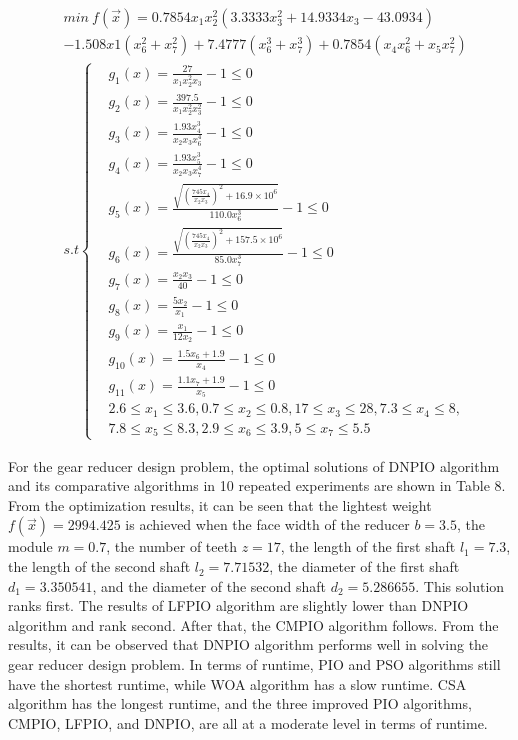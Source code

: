 \documentclass[preprint,review,compress,12pt]{elsarticle}
\begin{document}

\begin{equation}  \begin{split}  &min\ f(\vec{x})=0.7854x_1x^2_2(3.3333x^2_3+ 14.9334x_3−43.0934) \\
&−1.508x1(x^2_6+x^2_7) + 7.4777(x^3_6+x^3_7) + 0.7854(x_4x^2_6+x_5x^2_7)  \\
&s.t\left\{\begin{matrix}
 &g_1(x)=\frac{27}{x_1x^2_2x_3}-1 \le 0\\
 &g_2(x)=\frac{397.5}{x_1x^2_2x^2_3}-1 \le 0\\
 &g_3(x)=\frac{1.93x^3_4}{x_2x_3x^4_6}-1 \le 0\\
&g_4(x)=\frac{1.93x^3_5}{x_2x_3x^4_7}-1 \le 0\\
&g_5(x)=\frac{\sqrt{(\frac{745x_4}{x_2x_3})^2 +16.9\times 10^6 } }{110.0x^3_6}-1\le 0 \\
&g_6(x)=\frac{\sqrt{(\frac{745x_4}{x_2x_3})^2 +157.5\times 10^6 } }{85.0x^3_7}-1\le 0 \\
&g_7(x)=\frac{x_2x_3}{40}-1\le 0  \\
&g_8(x)=\frac{5x_2}{x_1}-1\le 0  \\
&g_9(x)=\frac{x_1}{12x_2}-1\le 0  \\
&g_10(x)=\frac{1.5x_6+1.9}{x_4}-1\le 0  \\
&g_11(x)=\frac{1.1x_7+1.9}{x_5}-1\le 0  \\
&2.6\le x_1 \le3.6, 0.7 \le x_2 \le 0.8, 17\le x_3 \le28, 7.3\le x_4 \le 8,\\ &7.8 \le x_5 \le8.3, 2.9\le x_6 \le 3.9, 5\le x_7 \le 5.5
\end{matrix}\right.  
\end{split}  \end{equation}

For the gear reducer design problem, the optimal solutions of DNPIO algorithm and its comparative algorithms in 10 repeated experiments are shown in Table 8. From the optimization results, it can be seen that the lightest weight $f(\vec{x})=2994.425$ is achieved when the face width of the reducer $b=3.5$, the module $m=0.7$, the number of teeth $z=17$, the length of the first shaft $l_1=7.3$, the length of the second shaft $l_2=7.71532$, the diameter of the first shaft $d_1=3.350541$, and the diameter of the second shaft $d_2=5.286655$. This solution ranks first. The results of LFPIO algorithm are slightly lower than DNPIO algorithm and rank second. After that, the CMPIO algorithm follows. From the results, it can be observed that DNPIO algorithm performs well in solving the gear reducer design problem. In terms of runtime, PIO and PSO algorithms still have the shortest runtime, while WOA algorithm has a slow runtime. CSA algorithm has the longest runtime, and the three improved PIO algorithms, CMPIO, LFPIO, and DNPIO, are all at a moderate level in terms of runtime.
\end{document}
